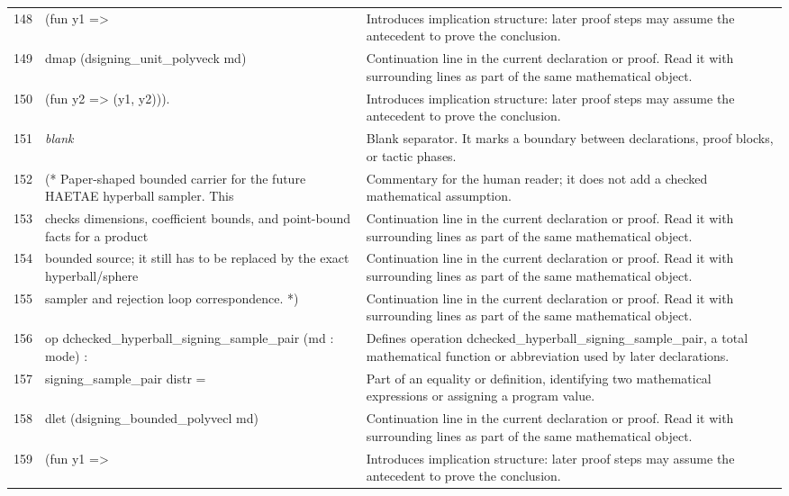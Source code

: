 \documentclass[10pt]{article}
\begin{document}
\begin{longtable}{r L{0.53\textwidth} L{0.37\textwidth}}
148 & {\ttfamily\scriptsize     (fun y1 =>} & Introduces implication structure: later proof steps may assume the antecedent to prove the conclusion. \\
149 & {\ttfamily\scriptsize       dmap (dsigning\_unit\_polyveck md)} & Continuation line in the current declaration or proof.  Read it with surrounding lines as part of the same mathematical object. \\
150 & {\ttfamily\scriptsize         (fun y2 => (y1, y2))).} & Introduces implication structure: later proof steps may assume the antecedent to prove the conclusion. \\
151 & {\ttfamily\scriptsize \emph{blank}} & Blank separator.  It marks a boundary between declarations, proof blocks, or tactic phases. \\
152 & {\ttfamily\scriptsize (* Paper-shaped bounded carrier for the future HAETAE hyperball sampler. This} & Commentary for the human reader; it does not add a checked mathematical assumption. \\
153 & {\ttfamily\scriptsize    checks dimensions, coefficient bounds, and point-bound facts for a product} & Continuation line in the current declaration or proof.  Read it with surrounding lines as part of the same mathematical object. \\
154 & {\ttfamily\scriptsize    bounded source; it still has to be replaced by the exact hyperball/sphere} & Continuation line in the current declaration or proof.  Read it with surrounding lines as part of the same mathematical object. \\
155 & {\ttfamily\scriptsize    sampler and rejection loop correspondence. *)} & Continuation line in the current declaration or proof.  Read it with surrounding lines as part of the same mathematical object. \\
156 & {\ttfamily\scriptsize op dchecked\_hyperball\_signing\_sample\_pair (md : mode) :} & Defines operation dchecked\_hyperball\_signing\_sample\_pair, a total mathematical function or abbreviation used by later declarations. \\
157 & {\ttfamily\scriptsize    signing\_sample\_pair distr =} & Part of an equality or definition, identifying two mathematical expressions or assigning a program value. \\
158 & {\ttfamily\scriptsize   dlet (dsigning\_bounded\_polyvecl md)} & Continuation line in the current declaration or proof.  Read it with surrounding lines as part of the same mathematical object. \\
159 & {\ttfamily\scriptsize     (fun y1 =>} & Introduces implication structure: later proof steps may assume the antecedent to prove the conclusion. \\

\end{longtable}
\end{document}
